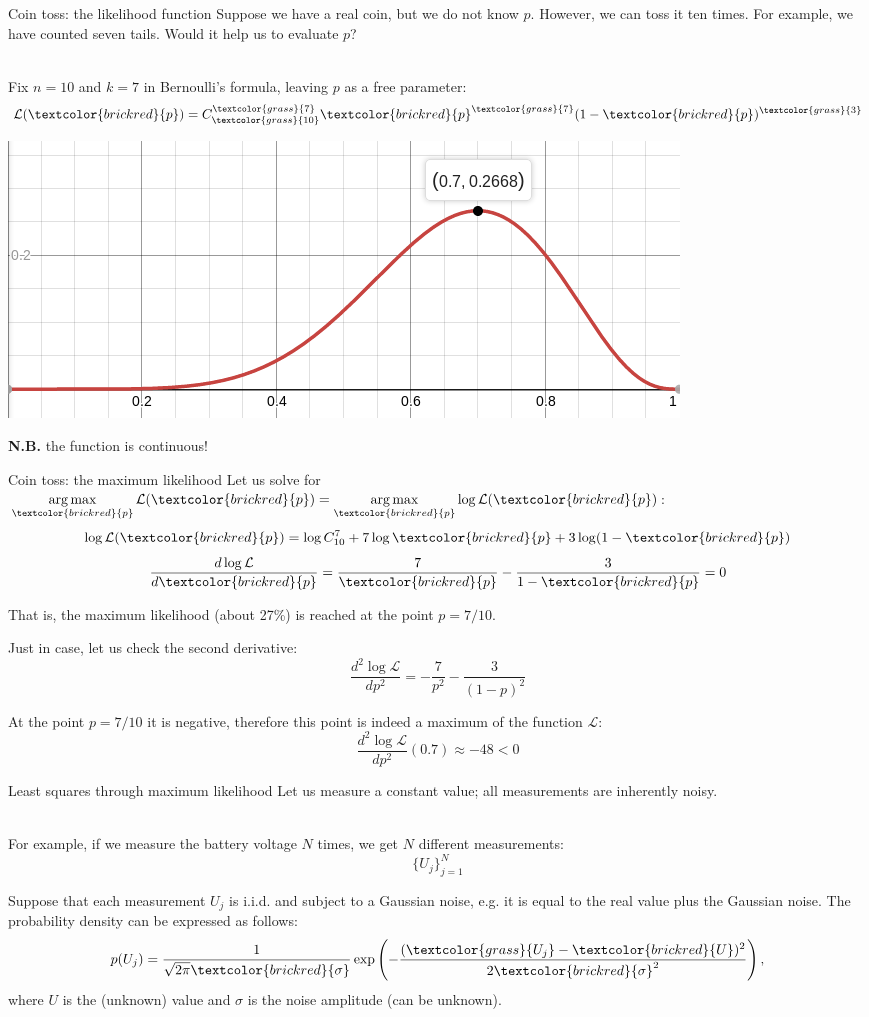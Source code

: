 \documentclass[UKenglish,aspectratio=169]{beamer}
\DeclareMathOperator*{\argmax}{arg\,max}
\newcommand\unknown[1]{\textcolor{brickred}{#1}}
\newcommand\known[1]{\textcolor{grass}{#1}}
\begin{document}
\begin{frame}{Coin toss: the likelihood function}
Suppose we have a real coin, but we do not know $p$.
However, we can toss it ten times. For example, we have counted seven tails.
Would it help us to evaluate $p$?

\pause
~\\
Fix $n=10$ and $k=7$ in Bernoulli's formula, leaving $p$ as a free parameter:
$$\mathcal{L}(\unknown{p}) = C_{\known{10}}^{\known{7}} \unknown{p}^{\known{7}} (1-\unknown{p})^{\known{3}}$$

\pause
\begin{center}
\includegraphics[width=.5\columnwidth]{../manuscript/img/likehood-07.png}
\end{center}
\textbf{N.B.} the function is continuous!
\end{frame}

\begin{frame}{Coin toss: the maximum likelihood}
Let us solve for $\argmax\limits_{\unknown{p}} \mathcal L(\unknown{p}) = \argmax\limits_{\unknown{p}} \log\mathcal{L}(\unknown{p})$:
\pause
$$\log \mathcal{L}(\unknown{p}) = \log C_{10}^7 + 7 \log \unknown{p} + 3\log (1-\unknown{p})$$
\pause
$$\frac{d \log \mathcal{L}}{d\unknown{p}} = \frac{7}{\unknown{p}} - \frac{3}{1-\unknown{p}} = 0$$

\pause
That is, the maximum likelihood (about 27\%) is reached at the point $p=7/10$.

\pause
Just in case, let us check the second derivative:
$$\frac{d^2 \log \mathcal{L}}{dp^2} = -\frac{7}{p^2} - \frac{3}{(1-p)^2}$$

At the point $p=7/10$ it is negative, therefore this point is indeed a maximum of the function $\mathcal{L}$:
$$\frac{d^2 \log \mathcal{L}}{dp^2}(0.7)  \approx -48 < 0$$
\end{frame}

\begin{frame}{Least squares through maximum likelihood}
Let us measure a constant value; all measurements are inherently noisy.

~\\

For example, if we measure the battery voltage $N$ times, we get $N$ different measurements:
$$
\{U_j\}_{j=1}^{N}
$$

Suppose that each measurement $U_j$ is i.i.d. and subject to a Gaussian noise, e.g. it is equal to the real value plus the Gaussian noise.
The probability density can be expressed as follows:
$$
p(U_j) = \frac{1}{\sqrt{2\pi}\unknown{\sigma}} \exp\left(-\frac{(\known{U_j}-\unknown{U})^2}{2\unknown{\sigma}^2}\right),
$$
where $U$ is the (unknown) value and $\sigma$ is the noise amplitude (can be unknown).
\end{frame}
\end{document}
